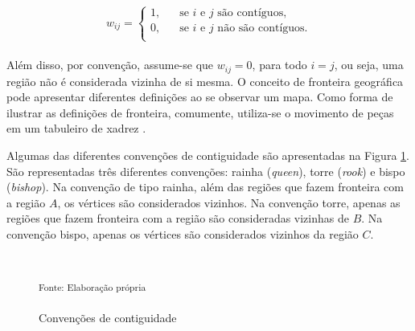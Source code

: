 \documentclass[12pt,a4paper]{article}
\begin{document}
\[
w_{ij} = 
	\begin{cases}
    	\text{1,} & \quad\text{se $i$ e $j$ são contíguos}, \\
	    \text{0,} & \quad\text{se $i$ e $j$ não são contíguos.}\\
	\end{cases}
\]
\\
	
Além disso, por convenção, assume-se que  $w_{ij} =  0$, para todo $i = j$, ou seja, uma região não é considerada vizinha de si mesma. O conceito de fronteira geográfica pode apresentar diferentes definições ao se observar um mapa. Como forma de ilustrar as definições de fronteira, comumente, utiliza-se o movimento de peças em um tabuleiro de xadrez \cite{almeida12_g}. 

Algumas das diferentes convenções de contiguidade são apresentadas na Figura \ref{contiguidade_2}. São representadas três diferentes convenções: rainha (\textit{queen}), torre (\textit{rook}) e bispo (\textit{bishop}). Na convenção de tipo rainha, além das regiões que fazem fronteira com a região $A$, os vértices são considerados vizinhos. Na convenção torre, apenas as regiões que fazem fronteira com a região são consideradas vizinhas de $B$. Na convenção bispo, apenas os vértices são considerados vizinhos da região $C$.
	
\begin{figure}[H]
	\centering
    \caption{Convenções de contiguidade$\quad\quad$}\label{contiguidade_2}
	\small
	\hspace{0.2cm}
	\hspace{0.2cm}
	\\
    \parbox{\dimexpr\linewidth-8.3cm}{\raggedright
    \strut \textsuperscript{Fonte: Elaboração própria}\strut}
\end{figure}
	
\end{document}
